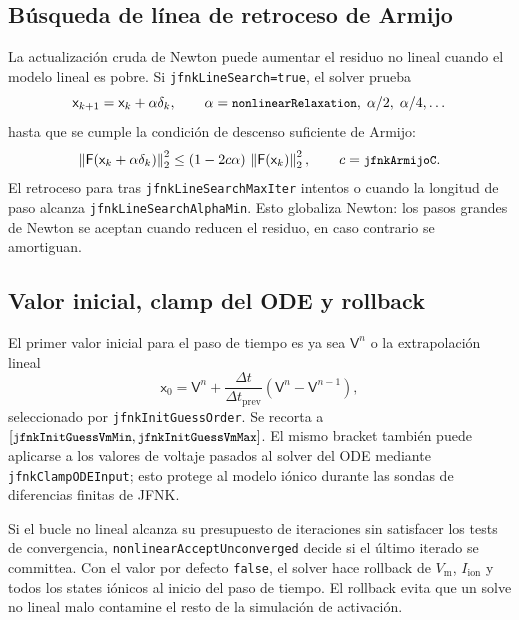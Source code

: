 \documentclass[11pt,a4paper]{article}
\newcommand{\code}[1]{\texttt{\small #1}}
\newcommand{\Vm}{V_{\text{m}}}
\newcommand{\Iion}{I_{\mathrm{ion}}}
\newcommand{\Fres}{\mathsf{F}}
\newcommand{\norm}[1]{\left\lVert #1 \right\rVert}
\begin{document}
\subsection{Búsqueda de línea de retroceso de Armijo}

La actualización cruda de Newton puede aumentar el residuo no lineal cuando el
modelo lineal es pobre. Si \code{jfnkLineSearch=true}, el solver prueba
\[
  \mathsf{x}_{k+1}=\mathsf{x}_{k}+\alpha\delta_{k},
  \qquad
  \alpha=\code{nonlinearRelaxation},\;
  \alpha/2,\;\alpha/4,\dots
\]
hasta que se cumple la condición de descenso suficiente de Armijo:
\begin{equation}
  \norm{\Fres(\mathsf{x}_{k}+\alpha\delta_{k})}_2^2
  \le
  (1-2c\alpha)\,\norm{\Fres(\mathsf{x}_{k})}_2^2,
  \qquad c=\code{jfnkArmijoC}.
  \label{eq:armijo}
\end{equation}
El retroceso para tras \code{jfnkLineSearchMaxIter} intentos o cuando la longitud de
paso alcanza \code{jfnkLineSearchAlphaMin}. Esto globaliza Newton: los pasos grandes
de Newton se aceptan cuando reducen el residuo, en caso contrario se amortiguan.

\subsection{Valor inicial, clamp del ODE y rollback}

El primer valor inicial para el paso de tiempo es ya sea $\mathsf{V}^{n}$ o la
extrapolación lineal
\begin{equation}
  \mathsf{x}_{0}
  =
  \mathsf{V}^{n}
  + \frac{\Delta t}{\Delta t_{\mathrm{prev}}}
    \left(\mathsf{V}^{n}-\mathsf{V}^{n-1}\right),
  \label{eq:extrap}
\end{equation}
seleccionado por \code{jfnkInitGuessOrder}. Se recorta a
$[\code{jfnkInitGuessVmMin},\code{jfnkInitGuessVmMax}]$. El mismo bracket también
puede aplicarse a los valores de voltaje pasados al solver del ODE mediante
\code{jfnkClampODEInput}; esto protege al modelo iónico durante las sondas de
diferencias finitas de JFNK.

Si el bucle no lineal alcanza su presupuesto de iteraciones sin satisfacer los tests
de convergencia, \code{nonlinearAcceptUnconverged} decide si el último iterado se
committea. Con el valor por defecto \code{false}, el solver hace rollback de $\Vm$,
$\Iion$ y todos los states iónicos al inicio del paso de tiempo. El rollback evita
que un solve no lineal malo contamine el resto de la simulación de activación.
\end{document}
